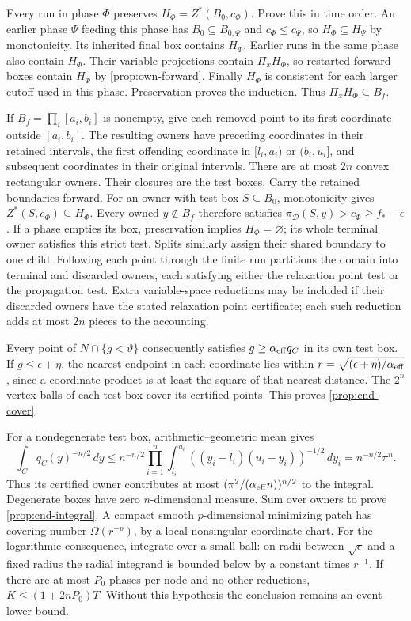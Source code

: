 Every run in phase $\Phi$ preserves
$H_\Phi=Z^*(B_0,c_\Phi)$. Prove this in time order. An earlier phase
$\Psi$ feeding this phase has $B_0\subseteq B_{0,\Psi}$ and
$c_\Phi\le c_\Psi$, so $H_\Phi\subseteq H_\Psi$ by monotonicity.
Its inherited final box contains $H_\Phi$. Earlier runs in the same
phase also contain $H_\Phi$. Their variable projections contain
$\Pi_xH_\Phi$, so restarted forward boxes contain $H_\Phi$ by
\eqref{prop:own-forward}. Finally $H_\Phi$ is consistent for each larger
cutoff used in this phase. Preservation proves the induction. Thus
$\Pi_xH_\Phi\subseteq B_f$.

If $B_f=\prod_i[a_i,b_i]$ is nonempty, give each removed point to its first
coordinate outside $[a_i,b_i]$. The resulting owners have preceding
coordinates in their retained intervals, the first offending coordinate
in $[l_i,a_i)$ or $(b_i,u_i]$, and subsequent coordinates in their original
intervals. There are at most $2n$ convex rectangular owners. Their closures
are the test boxes. Carry the retained boundaries forward. For an owner
with test box $S\subseteq B_0$, monotonicity gives
$Z^*(S,c_\Phi)\subseteq H_\Phi$. Every owned $y\notin B_f$ therefore
satisfies $\pi_{\mathcal D}(S,y)>c_\Phi\ge f_* -\epsilon$.
If a phase empties its box, preservation implies $H_\Phi=\varnothing$;
its whole terminal owner satisfies this strict test. Splits similarly
assign their shared boundary to one child. Following each point through
the finite run partitions the domain into terminal and discarded owners,
each satisfying either the relaxation point test or the propagation test.
Extra variable-space reductions may be included if their discarded owners
have the stated relaxation point certificate; each such reduction adds
at most $2n$ pieces to the accounting.

Every point of $N\cap\{g<\vartheta\}$ consequently satisfies
$g\ge\alpha_{\rm eff}q_C$ in its own test box. If $g\le\epsilon+\eta$,
the nearest endpoint in each coordinate lies within
$r=\sqrt{(\epsilon+\eta)/\alpha_{\rm eff}}$, since a coordinate product
is at least the square of that nearest distance. The $2^n$ vertex balls
of each test box cover its certified points. This proves
\eqref{prop:cnd-cover}.

For a nondegenerate test box, arithmetic--geometric mean gives
\[
 \int_Cq_C(y)^{-n/2}\,dy
 \le n^{-n/2}\prod_{i=1}^n
 \int_{l_i}^{u_i}((y_i-l_i)(u_i-y_i))^{-1/2}\,dy_i
 =n^{-n/2}\pi^n.
\]
Thus its certified owner contributes at most
$(\pi^2/(\alpha_{\rm eff}n))^{n/2}$ to the integral. Degenerate boxes
have zero $n$-dimensional measure. Sum over owners to prove
\eqref{prop:cnd-integral}. A compact smooth $p$-dimensional minimizing
patch has covering number $\Omega(r^{-p})$, by a local nonsingular
coordinate chart. For the logarithmic consequence, integrate over a
small ball: on radii between $\sqrt\epsilon$ and a fixed radius the
radial integrand is bounded below by a constant times $r^{-1}$.
If there are at most $P_0$ phases per node and no other reductions,
$K\le(1+2nP_0)T$. Without this hypothesis the conclusion remains an
event lower bound.


